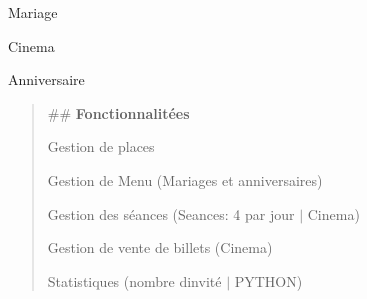 
\begin{DoxyItemize}
\item Mariage
\item Cinema
\item Anniversaire
\end{DoxyItemize}

\begin{quote}
\#\# {\bfseries{Fonctionnalitées}}


\begin{DoxyItemize}
\item Gestion de places
\item Gestion de Menu (Mariages et anniversaires)
\item Gestion des séances (Seances\+: 4 par jour $\vert$ Cinema)
\item Gestion de vente de billets (Cinema)
\item Statistiques (nombre d\textquotesingle{}invité $\vert$ PYTHON) 
\end{DoxyItemize}\end{quote}
